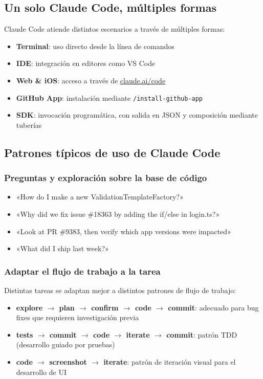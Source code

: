 \documentclass[a4paper]{article}
\begin{document}
\subsection{Un solo Claude Code, múltiples formas}

Claude Code atiende distintos escenarios a través de múltiples formas:

\begin{itemize}
    \item \textbf{Terminal}: uso directo desde la línea de comandos
    \item \textbf{IDE}: integración en editores como VS Code
    \item \textbf{Web \& iOS}: acceso a través de \url{claude.ai/code}
    \item \textbf{GitHub App}: instalación mediante \texttt{/install-github-app}
    \item \textbf{SDK}: invocación programática, con salida en JSON y composición mediante tuberías
\end{itemize}

\subsection{Patrones típicos de uso de Claude Code}

\subsubsection{Preguntas y exploración sobre la base de código}

\begin{itemize}
    \item «How do I make a new ValidationTemplateFactory?»
    \item «Why did we fix issue \#18363 by adding the if/else in login.ts?»
    \item «Look at PR \#9383, then verify which app versions were impacted»
    \item «What did I ship last week?»
\end{itemize}

\subsubsection{Adaptar el flujo de trabajo a la tarea}

Distintas tareas se adaptan mejor a distintos patrones de flujo de trabajo:
\begin{itemize}
    \item \textbf{explore $\rightarrow$ plan $\rightarrow$ confirm $\rightarrow$ code $\rightarrow$ commit}: adecuado para bug fixes que requieren investigación previa
    \item \textbf{tests $\rightarrow$ commit $\rightarrow$ code $\rightarrow$ iterate $\rightarrow$ commit}: patrón TDD (desarrollo guiado por pruebas)
    \item \textbf{code $\rightarrow$ screenshot $\rightarrow$ iterate}: patrón de iteración visual para el desarrollo de UI
\end{itemize}
\end{document}
